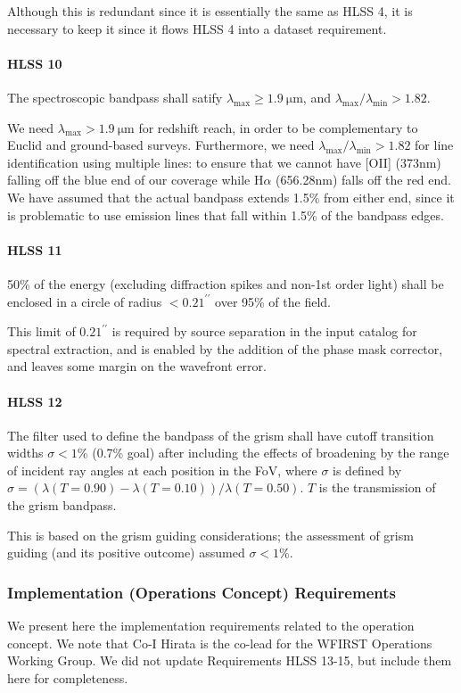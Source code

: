  Although this is redundant since it is essentially the same as HLSS 4, it is
 necessary to keep it since it flows HLSS 4 into a dataset requirement.

\paragraph{HLSS 10} The spectroscopic bandpass shall satify $\lambda_\mathrm{max} \geq 1.9\ \mathrm{\mu m}$, and $\lambda_\mathrm{max}/\lambda_\mathrm{min} > 1.82$.

 We need $\lambda_\mathrm{max} > 1.9\ \mathrm{ \mu m}$ for redshift reach, in order to be complementary to Euclid and ground-based surveys.  Furthermore, we need $\lambda_\mathrm{max}/\lambda_\mathrm{min} > 1.82$ for line identification using multiple lines: to ensure that we cannot have [OII] (373nm) falling off the blue end of our coverage while H$\alpha$ (656.28nm) falls off the red end. We have
 assumed that the actual bandpass extends 1.5\% from either end, since it is
 problematic to use emission lines that fall within 1.5\% of the bandpass edges.

\paragraph{HLSS 11} 50\% of the energy (excluding diffraction spikes and non-1st order light) shall be enclosed in a circle of radius $<0.21^{\prime\prime}$ over 95\% of the field.

 This limit of $0.21^{\prime\prime}$ is required by source separation in the input
 catalog for spectral extraction, and is enabled by the addition of the phase
 mask corrector, and leaves some margin on the wavefront error.

\paragraph{HLSS 12} The filter used to define the bandpass of the grism shall have cutoff transition widths $\sigma < 1\%$ (0.7\% goal) after including the effects of broadening
 by the range of incident ray angles at each position in the FoV, where $\sigma$ is
 defined by $\sigma= (\lambda(T=0.90)- \lambda(T=0.10))/\lambda(T=0.50)$. $T$ is the transmission of the
 grism bandpass.

 This is based on the grism guiding considerations; the assessment of grism
 guiding (and its positive outcome) assumed $\sigma < 1\%$.

 \subsubsection{Implementation (Operations Concept) Requirements} We present here the implementation requirements related to the operation concept. We note that Co-I Hirata is the co-lead for the WFIRST Operations Working Group. We did not update Requirements HLSS 13-15, but include them here for completeness.

